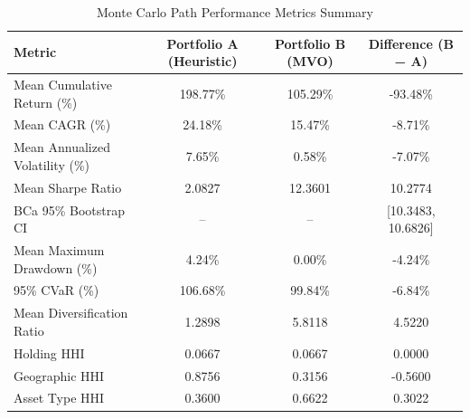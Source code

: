 \begin{table}[htbp]
\centering
\caption{Monte Carlo Path Performance Metrics Summary}
\label{tab:performance_summary}
\begin{tabular}{lccc}
\hline
\textbf{Metric} & \textbf{Portfolio A (Heuristic)} & \textbf{Portfolio B (MVO)} & \textbf{Difference (B − A)} \\
\hline
Mean Cumulative Return (\%) & 198.77\% & 105.29\% & -93.48\% \\
Mean CAGR (\%) & 24.18\% & 15.47\% & -8.71\% \\
Mean Annualized Volatility (\%) & 7.65\% & 0.58\% & -7.07\% \\
Mean Sharpe Ratio & 2.0827 & 12.3601 & 10.2774 \\
BCa 95\% Bootstrap CI & -- & -- & [10.3483, 10.6826] \\
Mean Maximum Drawdown (\%) & 4.24\% & 0.00\% & -4.24\% \\
95\% CVaR (\%) & 106.68\% & 99.84\% & -6.84\% \\
Mean Diversification Ratio & 1.2898 & 5.8118 & 4.5220 \\
Holding HHI & 0.0667 & 0.0667 & 0.0000 \\
Geographic HHI & 0.8756 & 0.3156 & -0.5600 \\
Asset Type HHI & 0.3600 & 0.6622 & 0.3022 \\
\hline
\end{tabular}
\end{table}
